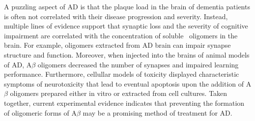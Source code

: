 A puzzling aspect of AD is that the plaque load in the brain of dementia patients is often not correlated with their disease progression and severity. Instead, multiple lines of evidence support that synaptic loss and the severity of cognitive impairment are correlated with the concentration of soluble \abeta\ oligomers in the brain.\cite{Wang:1999fx,McLean:1999ud,Lue:1999vx} For example, oligomers extracted from AD brain can impair synapse structure and function.\cite{Shankar:2008bg}
 Moreover, when injected into the brains of animal models of AD, A$\beta$ oligomers decreased the number of synapses and impaired learning performance.\cite{Lesne:2006gx,Cleary:2005kt,Martins:2007bz,Tam:2012vz} Furthermore, cellullar models of toxicity displayed characteristic symptoms of neurotoxicity that lead to eventual apoptosis upon the addition of A$\beta$ oligomers prepared either in vitro or extracted from cell cultures.\cite{Cappai:2007bc,Lambert:1998ve,Walsh:2002p2566,Shankar:2008bg,Walsh:2007fu} Taken together, current experimental evidence indicates that preventing the formation of oligomeric forms of A$\beta$ may be a promising method of treatment for AD.



